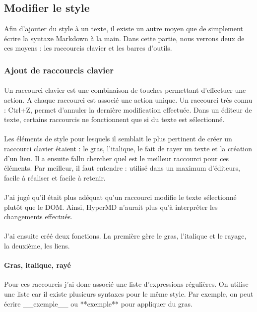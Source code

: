 \documentclass[12pt]{article}
\begin{document}
\newpage
\subsection{Modifier le style}
Afin d'ajouter du style à un texte, il existe un autre moyen que de simplement écrire la syntaxe Markdown à la main. Dans cette partie, nous verrons deux de ces moyens : les raccourcis clavier et les barres d'outils.

\subsubsection{Ajout de raccourcis clavier}
\paragraph{}
Un raccourci clavier est une combinaison de touches permettant d'effectuer une action. A chaque raccourci est associé une action unique. Un raccourci très connu : Ctrl+Z, permet d'annuler la dernière modification effectuée. Dans un éditeur de texte, certains raccourcis ne fonctionnent que si du texte est sélectionné.
\paragraph{}
Les éléments de style pour lesquels il semblait le plus pertinent de créer un raccourci clavier étaient : le gras, l'italique, le fait de rayer un texte et la création d'un lien. Il a ensuite fallu chercher quel est le meilleur raccourci pour ces éléments. Par meilleur, il faut entendre : utilisé dans un maximum d'éditeurs, facile à réaliser et facile à retenir.
\paragraph{}
J'ai jugé qu'il était plus adéquat qu'un raccourci modifie le texte sélectionné plutôt que le DOM. Ainsi, HyperMD n'aurait plus qu'à interpréter les changements effectués.
\paragraph{}
J'ai ensuite créé deux fonctions. La première gère le gras, l'italique et le rayage, la deuxième, les liens.

\paragraph{Gras, italique, rayé}
Pour ces raccourcis j'ai donc associé une liste d'expressions régulières. On utilise une liste car il existe plusieurs syntaxes pour le même style. Par exemple, on peut écrire \_\_exemple\_\_ ou **exemple** pour appliquer du gras.
\end{document}
